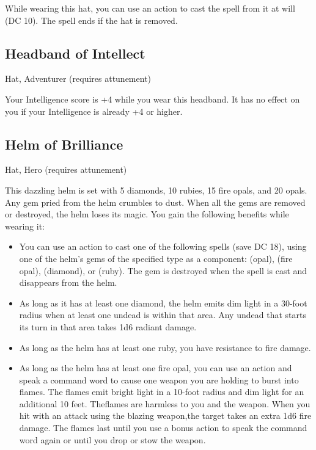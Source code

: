 While wearing this hat, you can use an action to cast the  spell from it at will (DC 10). The spell ends if the hat is removed.

\subsection{Headband of Intellect}
Hat, Adventurer (requires attunement) 

Your Intelligence score is +4 while you wear this headband. It has no effect on you if your Intelligence is already +4 or higher.

\subsection{Helm of Brilliance}
Hat, Hero (requires attunement) 

This dazzling helm is set with 5 diamonds, 10 rubies, 15 fire opals, and 20 opals. Any gem pried from the helm crumbles to dust. When all the gems are removed or destroyed, the helm loses its magic. You gain the following benefits while wearing it:
\begin{itemize}
    \item You can use an action to cast one of the following spells (save DC 18), using one of the helm's gems of the specified type as a component:  (opal),  (fire opal),  (diamond), or  (ruby). The gem is destroyed when the spell is cast and disappears from the helm.
    \item As long as it has at least one diamond, the helm emits dim light in a 30-foot radius when at least one undead is within that area. Any undead that starts its turn in that area takes 1d6 radiant damage.
    \item As long as the helm has at least one ruby, you have resistance to fire damage.
    \item As long as the helm has at least one fire opal, you can use an action and speak a command word to cause one weapon you are holding to burst into flames. The flames emit bright light in a 10-foot radius and dim light for an additional 10 feet. Theflames are harmless to you and the weapon. When you hit with an attack using the blazing weapon,the target takes an extra 1d6 fire damage. The flames last until you use a bonus action to speak the command word again or until you drop or stow the weapon.
\end{itemize}

